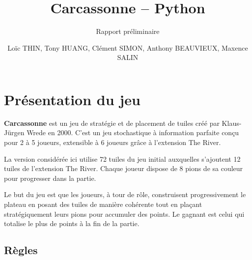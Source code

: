 \documentclass[a4paper]{article}
\title{Carcassonne -- Python}
\subtitle{Rapport préliminaire}
\author{Loïc THIN, Tony HUANG, Clément SIMON, Anthony BEAUVIEUX, Maxence SALIN}
\date{}
\begin{document}

\maketitle
\thispagestyle{empty}


\section{Présentation du jeu}

\textbf{Carcassonne} est un jeu de stratégie et de placement de tuiles créé par Klaus-Jürgen Wrede en 2000. C'est un jeu stochastique à information parfaite conçu pour 2 à 5 joueurs, extensible à 6 joueurs grâce à l'extension The River.

La version considérée ici utilise 72 tuiles du jeu initial auxquelles s'ajoutent 12 tuiles de l'extension The River. Chaque joueur dispose de 8 pions de sa couleur pour progresser dans la partie.

Le but du jeu est que les joueurs, à tour de rôle, construisent progressivement le plateau en posant des tuiles de manière cohérente tout en plaçant stratégiquement leurs pions pour accumuler des points. Le gagnant est celui qui totalise le plus de points à la fin de la partie.


\subsection{Règles}
\end{document}
